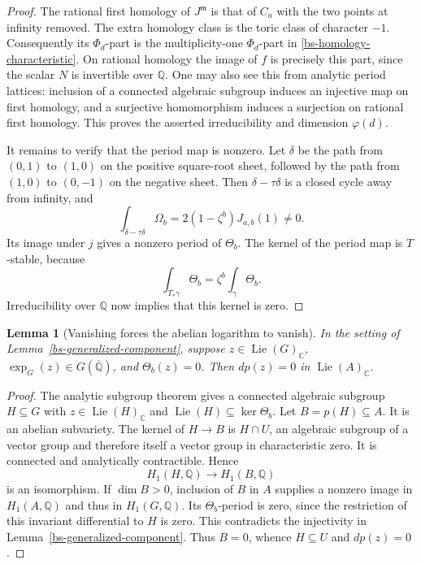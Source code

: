 \documentclass[11pt,a4paper]{article}
\newtheorem{lemma}[theorem]{Lemma}
\theoremstyle{definition}
\theoremstyle{remark}
\numberwithin{equation}{section}
\newcommand{\Qbar}{\overline{\mathbb Q}}
\begin{document}
\begin{proof}
The rational first homology of $J^{\mathfrak m}$ is that of $C_a$
with the two points at infinity removed.  The extra homology class is
the toric class of character $-1$.  Consequently its $\Phi_d$-part is
the multiplicity-one $\Phi_d$-part in
\eqref{bs-homology-characteristic}.
On rational homology the image of $f$ is precisely this part, since
the scalar $N$ is invertible over $\mathbb Q$.  One may also see this
from analytic period lattices: inclusion of a connected algebraic
subgroup induces an injective map on first homology, and a surjective
homomorphism induces a surjection on rational first homology.  This
proves the asserted irreducibility and dimension $\varphi(d)$.

It remains to verify that the period map is nonzero.  Let $\delta$ be
the path from $(0,1)$ to $(1,0)$ on the positive square-root sheet,
followed by the path from $(1,0)$ to $(0,-1)$ on the negative sheet.
Then $\delta-\tau\delta$ is a closed cycle away from infinity, and
\[
 \int_{\delta-\tau\delta}\Omega_b
 =2(1-\zeta^b)J_{a,b}(1)\ne0.
\]
Its image under $j$ gives a nonzero period of $\Theta_b$.  The kernel
of the period map is $T$-stable, because
\[
 \int_{T_*\gamma}\Theta_b
   =\zeta^b\int_\gamma\Theta_b.
\]
Irreducibility over $\mathbb Q$ now implies that this kernel is zero.
\end{proof}

\begin{lemma}[Vanishing forces the abelian logarithm to vanish]
\label{bs-kernel-lemma}
In the setting of Lemma~\ref{bs-generalized-component}, suppose
$z\in\operatorname{Lie}(G)_{\mathbb C}$,
$\exp_G(z)\in G(\Qbar)$, and $\Theta_b(z)=0$.
Then $dp(z)=0$ in $\operatorname{Lie}(A)_{\mathbb C}$.
\end{lemma}

\begin{proof}
The analytic subgroup theorem gives a connected algebraic subgroup
$H\subseteq G$ with $z\in\operatorname{Lie}(H)_{\mathbb C}$ and
$\operatorname{Lie}(H)\subseteq\ker\Theta_b$.
Let $B=p(H)\subseteq A$.  It is an abelian subvariety.  The kernel of
$H\to B$ is $H\cap U$, an algebraic subgroup of a vector group and
therefore itself a vector group in characteristic zero.  It is connected
and analytically contractible.  Hence
\[
 H_1(H,\mathbb Q)\longrightarrow H_1(B,\mathbb Q)
\]
is an isomorphism.  If $\dim B>0$, inclusion of $B$ in $A$ supplies
a nonzero image in $H_1(A,\mathbb Q)$ and thus in
$H_1(G,\mathbb Q)$.  Its $\Theta_b$-period is zero, since the
restriction of this invariant differential to $H$ is zero.  This
contradicts the injectivity in Lemma~\ref{bs-generalized-component}.
Thus $B=0$, whence $H\subseteq U$ and $dp(z)=0$.
\end{proof}
\end{document}
